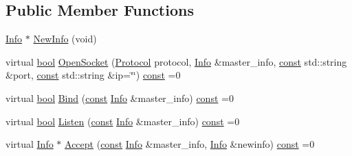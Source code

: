 \subsection*{Public Member Functions}
\begin{DoxyCompactItemize}
\item 
\hyperlink{classbpt_1_1_net_abs_1_1_i_net_access_1_1_info}{Info} $\ast$ \hyperlink{classbpt_1_1_net_abs_1_1_a_net_access_a704ebe8ad1301c925fd457208d873267}{New\-Info} (void)
\item 
virtual \hyperlink{term__entry_8h_a002004ba5d663f149f6c38064926abac}{bool} \hyperlink{classbpt_1_1_net_abs_1_1_a_net_access_ab9d3a7d419e31c11605b73f8c256dac9}{Open\-Socket} (\hyperlink{classbpt_1_1_net_abs_1_1_i_net_access_a4464fb7197d6a70c84c93aadaae560f6}{Protocol} protocol, \hyperlink{classbpt_1_1_net_abs_1_1_i_net_access_1_1_info}{Info} \&master\-\_\-info, \hyperlink{term__entry_8h_a57bd63ce7f9a353488880e3de6692d5a}{const} std\-::string \&port, \hyperlink{term__entry_8h_a57bd63ce7f9a353488880e3de6692d5a}{const} std\-::string \&ip=\char`\"{}\char`\"{}) \hyperlink{term__entry_8h_a57bd63ce7f9a353488880e3de6692d5a}{const} =0
\item 
virtual \hyperlink{term__entry_8h_a002004ba5d663f149f6c38064926abac}{bool} \hyperlink{classbpt_1_1_net_abs_1_1_a_net_access_a41ce9143a1101150acc9f8755ed83dc3}{Bind} (\hyperlink{term__entry_8h_a57bd63ce7f9a353488880e3de6692d5a}{const} \hyperlink{classbpt_1_1_net_abs_1_1_i_net_access_1_1_info}{Info} \&master\-\_\-info) \hyperlink{term__entry_8h_a57bd63ce7f9a353488880e3de6692d5a}{const} =0
\item 
virtual \hyperlink{term__entry_8h_a002004ba5d663f149f6c38064926abac}{bool} \hyperlink{classbpt_1_1_net_abs_1_1_a_net_access_a3af04974bf3fe002d622900f35598b27}{Listen} (\hyperlink{term__entry_8h_a57bd63ce7f9a353488880e3de6692d5a}{const} \hyperlink{classbpt_1_1_net_abs_1_1_i_net_access_1_1_info}{Info} \&master\-\_\-info) \hyperlink{term__entry_8h_a57bd63ce7f9a353488880e3de6692d5a}{const} =0
\item 
virtual \hyperlink{classbpt_1_1_net_abs_1_1_i_net_access_1_1_info}{Info} $\ast$ \hyperlink{classbpt_1_1_net_abs_1_1_a_net_access_aa6e3e1919e1691fd78b47883826fbbc5}{Accept} (\hyperlink{term__entry_8h_a57bd63ce7f9a353488880e3de6692d5a}{const} \hyperlink{classbpt_1_1_net_abs_1_1_i_net_access_1_1_info}{Info} \&master\-\_\-info, \hyperlink{classbpt_1_1_net_abs_1_1_i_net_access_1_1_info}{Info} \&newinfo) \hyperlink{term__entry_8h_a57bd63ce7f9a353488880e3de6692d5a}{const} =0
\item 

\end{DoxyCompactItemize}

